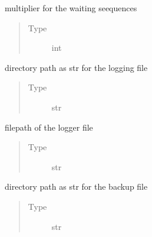 \documentclass[letterpaper,10pt,english]{sphinxmanual}
\begin{document}
\begin{fulllineitems}
\begin{fulllineitems}
\label{\detokenize{chatwolf:chatwolf.game.Game.wait_mult}}
multiplier for the waiting seequences
\begin{quote}\begin{description}
\item[{Type}] \leavevmode
int

\end{description}\end{quote}

\end{fulllineitems}


\begin{fulllineitems}
\label{\detokenize{chatwolf:chatwolf.game.Game.log_dir}}
directory path as str for the logging file
\begin{quote}\begin{description}
\item[{Type}] \leavevmode
str

\end{description}\end{quote}

\end{fulllineitems}


\begin{fulllineitems}
\label{\detokenize{chatwolf:chatwolf.game.Game.logfilename}}
filepath of the logger file
\begin{quote}\begin{description}
\item[{Type}] \leavevmode
str

\end{description}\end{quote}

\end{fulllineitems}


\begin{fulllineitems}
\label{\detokenize{chatwolf:chatwolf.game.Game.bkp_dir}}
directory path as str for the backup file
\begin{quote}\begin{description}
\item[{Type}] \leavevmode
str


\end{description}
\end{quote}
\end{fulllineitems}
\end{fulllineitems}
\end{document}
